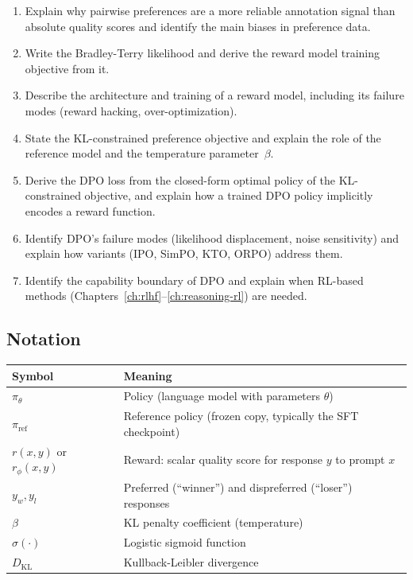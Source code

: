 \begin{enumerate}
  \item Explain why pairwise preferences are a more reliable annotation signal than absolute quality scores and identify the main biases in preference data.
  \item Write the Bradley-Terry likelihood and derive the reward model training objective from it.
  \item Describe the architecture and training of a reward model, including its failure modes (reward hacking, over-optimization).
  \item State the KL-constrained preference objective and explain the role of the reference model and the temperature parameter~$\beta$.
  \item Derive the DPO loss from the closed-form optimal policy of the KL-constrained objective, and explain how a trained DPO policy implicitly encodes a reward function.
  \item Identify DPO's failure modes (likelihood displacement, noise sensitivity) and explain how variants (IPO, SimPO, KTO, ORPO) address them.
  \item Identify the capability boundary of DPO and explain when RL-based methods (Chapters~\ref{ch:rlhf}--\ref{ch:reasoning-rl}) are needed.
\end{enumerate}


\subsection*{Notation}

\begin{center}
\begin{tabular}{ll}
\toprule
Symbol & Meaning \\
\midrule
$\pi_\theta$ & Policy (language model with parameters $\theta$) \\
$\pi_{\text{ref}}$ & Reference policy (frozen copy, typically the SFT checkpoint) \\
$r(x, y)$ or $r_\phi(x, y)$ & Reward: scalar quality score for response $y$ to prompt $x$ \\
$y_w, y_l$ & Preferred (``winner'') and dispreferred (``loser'') responses \\
$\beta$ & KL penalty coefficient (temperature) \\
$\sigma(\cdot)$ & Logistic sigmoid function \\
$D_{\text{KL}}$ & Kullback-Leibler divergence \\
\bottomrule
\end{tabular}
\end{center}


